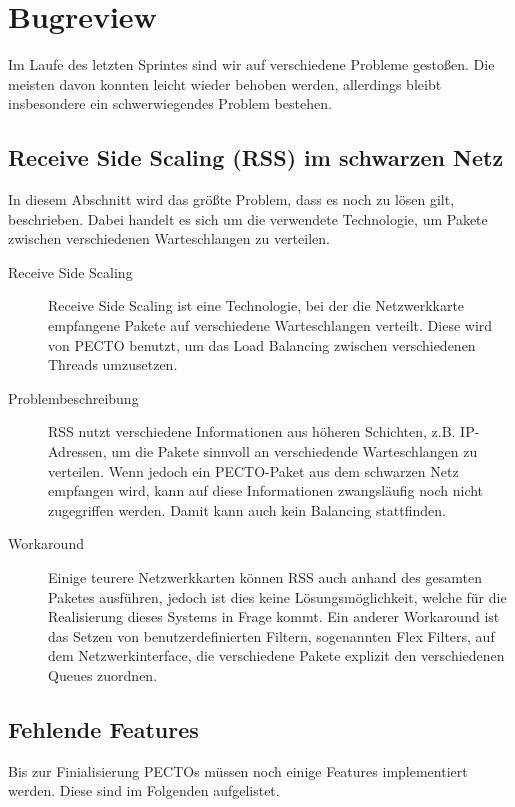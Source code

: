 \documentclass[a4paper, 11pt, ngerman, fleqn]{article}
\begin{document}
\clearpage
\section{Bugreview}
Im Laufe des letzten Sprintes sind wir auf verschiedene Probleme gestoßen.
Die meisten davon konnten leicht wieder behoben werden, allerdings bleibt insbesondere ein schwerwiegendes Problem bestehen.

\subsection{Receive Side Scaling (RSS) im schwarzen Netz}
In diesem Abschnitt wird das größte Problem, dass es noch zu lösen gilt, beschrieben.
Dabei handelt es sich um die verwendete Technologie, um Pakete zwischen verschiedenen Warteschlangen zu verteilen.

\begin{description}
	
	\item[Receive Side Scaling] 
	Receive Side Scaling ist eine Technologie, bei der die Netzwerkkarte empfangene Pakete auf verschiedene Warteschlangen verteilt.
	Diese wird von PECTO benutzt, um das Load Balancing zwischen verschiedenen Threads umzusetzen.
	
	\item[Problembeschreibung]
	RSS nutzt verschiedene Informationen aus höheren Schichten, z.B. IP-Adressen, um die Pakete sinnvoll an verschiedende Warteschlangen zu verteilen. 
	Wenn jedoch ein PECTO-Paket aus dem schwarzen Netz empfangen wird, kann auf diese Informationen zwangsläufig noch nicht zugegriffen werden.
	Damit kann auch kein Balancing stattfinden.
	
	\item[Workaround]
	Einige teurere Netzwerkkarten können RSS auch anhand des gesamten Paketes ausführen, jedoch ist dies keine Lösungsmöglichkeit, welche für die Realisierung dieses Systems in Frage kommt.
	Ein anderer Workaround ist das Setzen von benutzerdefinierten Filtern, sogenannten Flex Filters, auf dem Netzwerkinterface, die verschiedene Pakete explizit den verschiedenen Queues zuordnen. 
\end{description}

\subsection{Fehlende Features}
Bis zur Finialisierung PECTOs müssen noch einige Features implementiert werden.
Diese sind im Folgenden aufgelistet.
\end{document}
